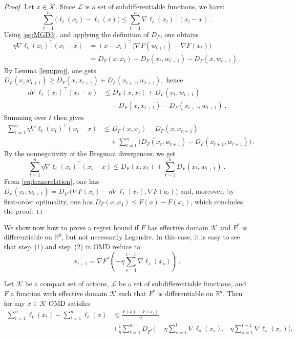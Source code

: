 \documentclass[11pt]{hackednow}
\newcommand{\R}{\mathbb{R}}
\newcommand{\cL}{\mathcal{L}}
\newcommand{\cK}{\mathcal{K}}
\begin{document}
\begin{proof}
Let $x \in \cK$. Since $\cL$ is a set of subdifferentiable functions, we have:
$$\sum_{t=1}^n \bigl( \ell_t(x_t) - \ell_t(x) \bigr) \leq \sum_{t=1}^n \nabla \ell_t(x_t)^{\top} (x_t -x)~.$$
Using \eqref{eq:MGD3}, and applying the definition of $D_F$, one obtains
  \begin{align*}
  \eta \nabla \ell_t(x_t)^{\top} (x_t - x) & = (x-x_t)^{\top} \big(\nabla F(w_{t+1}) - \nabla F(x_t) \big)\\
  & = D_F(x,x_t)+D_F(x_t,w_{t+1})-D_F(x,w_{t+1})~.
  \end{align*}
By Lemma \ref{lem:proj}, one gets 
  $D_F(x,w_{t+1}) \ge D_F(x,x_{t+1}) + D_F(x_{t+1},w_{t+1}),$ hence
  \begin{align*}
  \eta \nabla \ell_t(x_t)^{\top} (x_t - x) & \le D_F(x,x_t)+D_F(x_t,w_{t+1}) \\
& \quad -D_F(x,x_{t+1})-D_F(x_{t+1},w_{t+1})~.
  \end{align*}
Summing over $t$ then gives  
  \begin{align*}
  \sum_{t=1}^n \eta \nabla \ell_t(x_t)^{\top} (x_t - x) & \le D_F(x,x_1)-D_F(x,x_{n+1}) \\
& \quad +\sum_{t=1}^n \big(D_F(x_t,w_{t+1}) -D_F(x_{t+1},w_{t+1})\big)~.
  \end{align*}
By the nonnegativity of the Bregman divergences, we get 
$$\sum_{t=1}^n \eta \nabla \ell_t(x_t)^{\top} (x_t - x)
\le D_F(x,x_1)+\sum_{t=1}^n D_F(x_t,w_{t+1})~.$$
From \eqref{eq:transrelation}, one has
  $
  D_F(x_t,w_{t+1})=D_{F^*}\big(\nabla F(x_t)- \eta \nabla \ell_t(x_t),\nabla F(a_t)\big)
  $
and, moreover, by first-order optimality, one has $D_F(x,x_1) \leq F(x) - F(x_1)$, which concludes the proof.
\end{proof}
%
We show now how to prove a regret bound if $F$ has effective domain $\cK$ and $F^*$ is differentiable on $\R^d$, but not necessarily Legendre. In this case, it is easy to see that step~(1) and step~(2) in OMD reduce to
\[
x_{t+1} = \nabla F^* \left( - \eta \sum_{s=1}^{t-1} \nabla \ell_s(x_s) \right)~.
\]
%
\begin{theorem} \label{th:Fnotlegendre}
Let $\cK$ be a compact set of actions, $\cL$ be a set of subdifferentiable functions, and $F$ a function with effective domain $\cK$ such that $F^*$ is differentiable on $\R^d$. Then for any $x \in \cK$ OMD satisfies
\begin{align*}
\sum_{t=1}^n \ell_t(x_t) - \sum_{t=1}^n \ell_t(x)
& \leq \frac{F(x) - F(x_1)}{\eta} \\
& + \frac{1}{\eta} \sum_{t=1}^n D_{F^*}\bigg(- \eta \sum_{s=1}^{t} \nabla \ell_s(x_s), - \eta \sum_{s=1}^{t-1} \nabla \ell_s(x_s) \bigg).
\end{align*}
\end{theorem}
\end{document}
